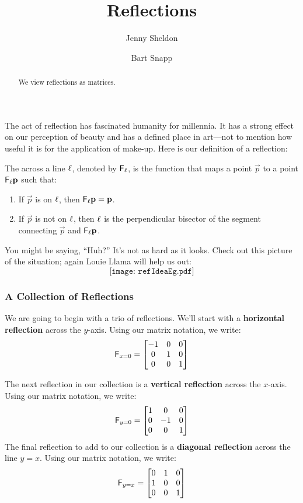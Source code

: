 \documentclass{ximera}
\author{Jenny Sheldon \and Bart Snapp}
\title{Reflections}
\begin{document}
\begin{abstract}
  We view reflections as matrices.
\end{abstract}
\maketitle

The act of reflection has fascinated humanity for millennia.  It has a
strong effect on our perception of beauty and has a defined place in
art---not to mention how useful it is for the application
of make-up. Here is our definition of a reflection:

\begin{definition}
The  across a line $\ell$, denoted by $\mathsf{F}_\ell$, is the
function that maps a point $\vec{p}$ to a point $\mathsf{F}_\ell
\mathbf{p}$ such that:
\begin{enumerate}
\item If $\vec{p}$ is on $\ell$, then $\mathsf{F}_\ell \mathbf{p} = \mathbf{p}$.
\item If $\vec{p}$ is not on $\ell$, then $\ell$ is the perpendicular
  bisector of the segment connecting $\vec{p}$ and $\mathsf{F}_\ell \mathbf{p}$. 
\end{enumerate}
\end{definition}

You might be saying, ``Huh?''  It's not as hard as it looks.  Check
out this picture of the situation; again Louie Llama 
will help us out:
\[
\texttt{[image: refIdeaEg.pdf]}
\]

\subsubsection{A Collection of Reflections}

We are going to begin with a trio of reflections. We'll start with a
\textbf{horizontal reflection} across the $y$-axis.  Using
our matrix notation, we write:
\[
\mathsf{F}_{x=0} =
\begin{bmatrix}
-1 & 0 & 0\\
 0 & 1 & 0\\
 0 & 0 & 1
\end{bmatrix}
\]

The next reflection in our collection is a \textbf{vertical
  reflection}
across the $x$-axis.  Using our matrix notation, we write:
\[
\mathsf{F}_{y=0} =
\begin{bmatrix}
1 &  0 & 0\\
0 & -1 & 0\\
0 &  0 & 1
\end{bmatrix}
\]
The final reflection to add to our collection is a \textbf{diagonal
  reflection}
across the line $y=x$.  Using our matrix notation, we write:
\[
\mathsf{F}_{y=x} =
\begin{bmatrix}
0 & 1 & 0\\
1 & 0 & 0\\
0 & 0 & 1
\end{bmatrix}
\]
\end{document}
